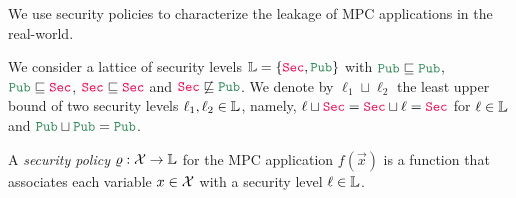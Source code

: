 We use security policies to characterize the leakage of MPC applications in the real-world.



{}
We consider a lattice of security levels $\seclev=\{\Sec,\Pub\}$
with $\Pub \sqsubseteq\Pub$, $\Pub \sqsubseteq\Sec$, $\Sec \sqsubseteq\Sec$
and $\Sec \not\sqsubseteq\Pub$.
We denote by $\ell_1\sqcup\ell_2$ the least upper bound of
two security levels $\ell_1,\ell_2\in\mathbb{L}$, namely,
$\ell\sqcup \Sec = \Sec\sqcup \ell=\Sec$ for $\ell\in\mathbb{L}$
and $\Pub\sqcup \Pub=\Pub$.




\begin{definition}
A \emph{security policy} $\varrho:\mathcal{X}\rightarrow \mathbb{L}$ for the MPC application $f(\vec{x})$ is a function that associates each variable $x\in \mathcal{X}$ with a security level $\ell\in \mathbb{L}$.
\end{definition}

